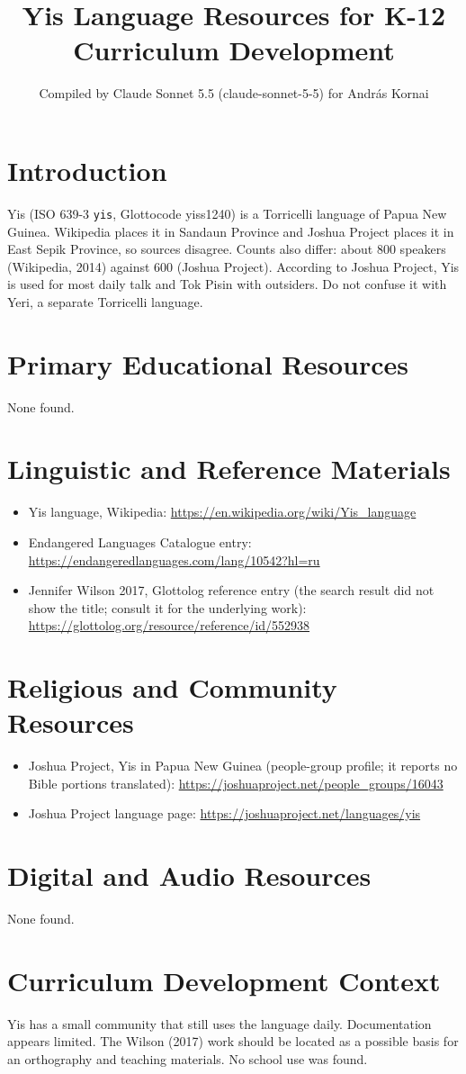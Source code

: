 \documentclass[12pt]{article}
\title{Yis Language Resources for K-12 Curriculum Development}
\author{Compiled by Claude Sonnet 5.5 (claude-sonnet-5-5) for Andr\'as Kornai}
\date{}
\begin{document}
\maketitle

\section{Introduction}
Yis (ISO 639-3 \texttt{yis}, Glottocode yiss1240) is a Torricelli language of Papua New Guinea. Wikipedia places it in Sandaun Province and Joshua Project places it in East Sepik Province, so sources disagree. Counts also differ: about 800 speakers (Wikipedia, 2014) against 600 (Joshua Project). According to Joshua Project, Yis is used for most daily talk and Tok Pisin with outsiders. Do not confuse it with Yeri, a separate Torricelli language.

\section{Primary Educational Resources}
None found.

\section{Linguistic and Reference Materials}
\begin{itemize}
\item Yis language, Wikipedia: \url{https://en.wikipedia.org/wiki/Yis_language}
\item Endangered Languages Catalogue entry: \url{https://endangeredlanguages.com/lang/10542?hl=ru}
\item Jennifer Wilson 2017, Glottolog reference entry (the search result did not show the title; consult it for the underlying work): \url{https://glottolog.org/resource/reference/id/552938}
\end{itemize}

\section{Religious and Community Resources}
\begin{itemize}
\item Joshua Project, Yis in Papua New Guinea (people-group profile; it reports no Bible portions translated): \url{https://joshuaproject.net/people_groups/16043}
\item Joshua Project language page: \url{https://joshuaproject.net/languages/yis}
\end{itemize}

\section{Digital and Audio Resources}
None found.

\section{Curriculum Development Context}
Yis has a small community that still uses the language daily. Documentation appears limited. The Wilson (2017) work should be located as a possible basis for an orthography and teaching materials. No school use was found.
\end{document}
